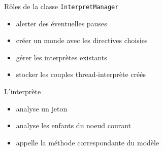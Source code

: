 \begin{frame}[fragile]
Rôles de la classe \verb|InterpretManager|
\begin{itemize}
	\item alerter des éventuelles pauses
	\item créer un monde avec les directives choisies
	\item gérer les interprètes existants
	\item stocker les couples thread-interprète créés
\end{itemize}
\end{frame}

\begin{frame}

L'interprète
\begin{itemize}
	\item analyse un jeton
	\item analyse les enfants du noeud courant
	\item appelle la méthode correspondante du modèle
\end{itemize}
\end{frame}
